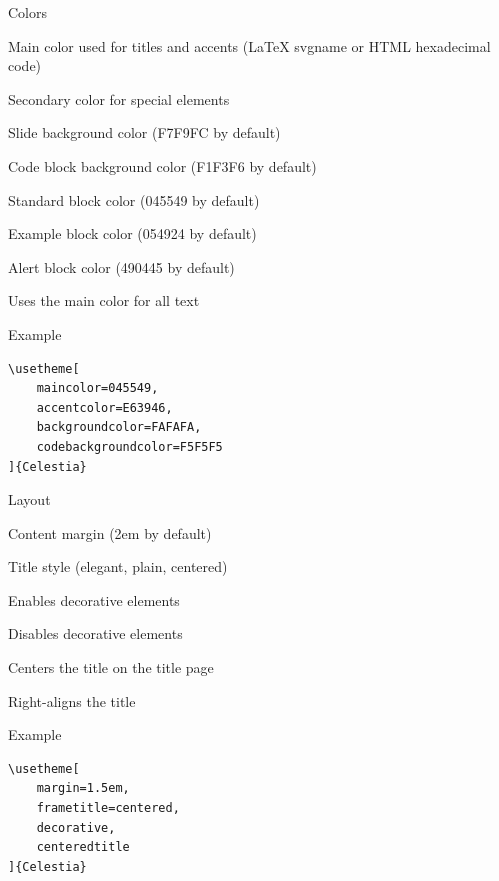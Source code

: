 \documentclass[10pt,english,aspectratio=1610,xcolor=svgnames]{beamer}
\begin{document}
\begin{frame}[fragile]{Colors}
    \begin{description}[codebackgroundcolor]
        \item[maincolor] Main color used for titles and accents (\alert{\LaTeX} svgname or \alert{HTML} hexadecimal code)
        \item[accentcolor] Secondary color for special elements
        \item[backgroundcolor] Slide background color (\alert{F7F9FC} by default)
        \item[codebackgroundcolor] Code block background color (\alert{F1F3F6} by default)
        \item[mainblue] Standard block color (\alert{045549} by default)
        \item[maingreen] Example block color (\alert{054924} by default)
        \item[mainred] Alert block color (\alert{490445} by default)
        \item[unicolor] Uses the main color for all text
    \end{description}

    \begin{exampleblock}{Example}
        \begin{lstlisting}[style=latex]
\usetheme[
    maincolor=045549,
    accentcolor=E63946,
    backgroundcolor=FAFAFA,
    codebackgroundcolor=F5F5F5
]{Celestia}
        \end{lstlisting}
    \end{exampleblock}
\end{frame}

\begin{frame}[fragile]{Layout}
    \begin{description}[centeredtitle]
        \item[margin] Content margin (\alert{2em} by default)
        \item[frametitle] Title style (\alert{elegant}, \alert{plain}, \alert{centered})
        \item[decorative] Enables decorative elements
        \item[nodecorative] Disables decorative elements
        \item[centeredtitle] Centers the title on the title page
        \item[titleright] Right-aligns the title
    \end{description}

    \begin{exampleblock}{Example}
        \begin{lstlisting}[style=latex]
\usetheme[
    margin=1.5em,
    frametitle=centered,
    decorative,
    centeredtitle
]{Celestia}
        \end{lstlisting}
    \end{exampleblock}
\end{frame}
\end{document}
